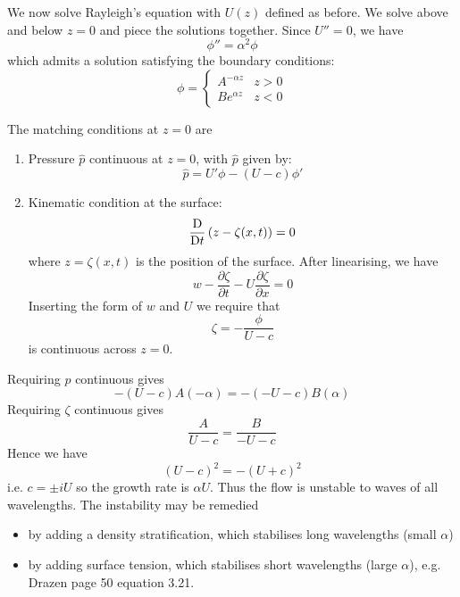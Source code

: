 \documentclass{jknotes}
\begin{document}
We now solve Rayleigh's equation with $U(z)$ defined as before. We solve above
and below $z=0$ and piece the solutions together. Since $U'' = 0$, we have
\begin{equation}
	\phi'' = \alpha^2 \phi
\end{equation}
which admits a solution satisfying the boundary conditions:
\begin{equation}
	\phi = \begin{cases} A^{-\alpha z} & z > 0 \\ B e^{\alpha z} & z < 0 
	\end{cases}
\end{equation}

The matching conditions at $z=0$ are
\begin{enumerate}
	\item Pressure $\hat{p}$ continuous at $z=0$, with $\hat{p}$ given by:
		\begin{equation}
			\hat{p} = U' \phi - (U-c) \phi'
		\end{equation}
	\item Kinematic condition at the surface:
		\begin{equation}
			\frac{\mathrm{D}}{\mathrm{D} t} \left( z - \zeta(x,t)\right) = 0
		\end{equation}
		where $z=\zeta(x,t)$ is the position of the surface.
		After linearising, we have
		\begin{equation}
			 w - \frac{\partial \zeta}{\partial t} - U\frac{\partial
			 \zeta}{\partial x} = 0
		\end{equation}
	 	Inserting the form of $w$ and $U$ we require that
	 	\begin{equation}
		 	\zeta = - \frac{\phi}{U-c}
	 	\end{equation}
	 	is continuous across $z=0$.
\end{enumerate}
Requiring $p$ continuous gives
\begin{equation}
	-(U-c)A(-\alpha) = - (-U-c)B(\alpha)
\end{equation}
Requiring $\zeta$ continuous gives
\begin{equation}
	\frac{A}{U-c} = \frac{B}{-U-c}
\end{equation}
Hence we have
\begin{equation}
	(U-c)^2 = -(U+c)^2
\end{equation}
i.e. $c = \pm i U$ so the growth rate is $\alpha U$. Thus the flow is unstable
to waves of all wavelengths. The instability may be remedied 
\begin{itemize}
	\item by adding a density stratification, which stabilises long
		wavelengths (small $\alpha$)
	\item by adding surface tension, which stabilises short wavelengths (large
		$\alpha$), e.g. Drazen page 50 equation 3.21.
\end{itemize}
\end{document}
